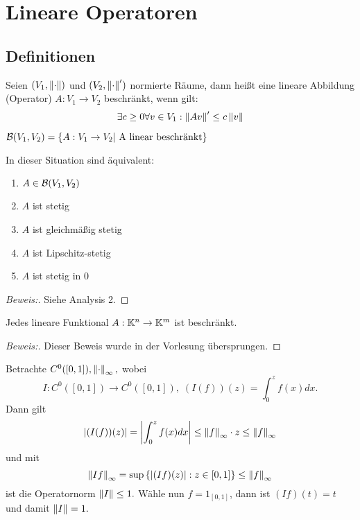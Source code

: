 \chapter{Lineare Operatoren}

\section{Definitionen}
\begin{definition}
    Seien $(V_1, \left\lVert\cdot\right\rVert)$ und $(V_2, \left\lVert\cdot\right\rVert')$ normierte Räume, dann heißt eine lineare Abbildung (Operator) $A: V_1 \to V_2$ beschränkt, wenn gilt: \[ \exists c \geq 0 \forall v \in V_1: \left\lVert Av\right\rVert' \leq c \left\lVert v\right\rVert\]
\end{definition}

\begin{rem}
    $\mathcal{B}(V_1, V_2) = \left\{A: V_1 \to V_2| \text{ A linear beschränkt}\right\}$
\end{rem}

\begin{theorem}
    In dieser Situation sind äquivalent:
    \label{B(V,W)_equiv}
    \begin{enumerate}
        \item $A \in \mathcal{B}(V_1, V_2)$
        \item $A$ ist stetig
        \item $A$ ist gleichmäßig stetig
        \item $A$ ist Lipschitz-stetig
        \item $A$ ist stetig in $0$
    \end{enumerate}
    \begin{proof}[Beweis:] Siehe Analysis 2.
    
    \end{proof}
\end{theorem}


\begin{theorem} 
    Jedes lineare Funktional $A: \mathbb{K}^n \to \mathbb{K}^m$ ist beschränkt.
    \begin{proof}[Beweis:] Dieser Beweis wurde in der Vorlesung übersprungen.
    \end{proof}
\end{theorem}

\begin{ex} \label{Volterra_op}
    Betrachte $C^0([0, 1]), \left\lVert\cdot\right\rVert_\infty,$ wobei \[I: C^0([0, 1]) \to C^0([0, 1]), \;(I(f))(z) = \int_0^zf(x)dx.\] Dann gilt \[\left\lvert (I(f))(z) \right\rvert = \left\lvert \int_0^zf(x)dx \right\rvert \le \left\lVert f\right\rVert_\infty\cdot z \leq \left\lVert f\right\rVert_\infty\]
    und mit \[\left\lVert If\right\rVert_\infty = \sup\left\{\left\lvert (If)(z) \right\rvert:z\in [0, 1]\right\} \leq \left\lVert f\right\rVert_\infty\]
    ist die Operatornorm $\left\lVert I\right\rVert \leq 1.$ Wähle nun $f = 1_{[0, 1]}$, dann ist $(If)(t) = t$ und damit $\left\lVert I\right\rVert = 1.$
\end{ex}

